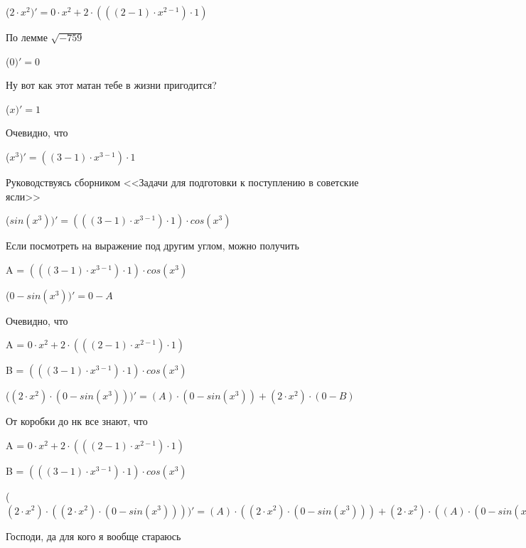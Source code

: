 \documentclass[12pt,a4paper,fleqn]{article}
\begin{document}
\begin{center}
 ($2 \cdot x^{2})'
  = 0 \cdot x^{2}+2 \cdot (((2-1) \cdot x^{2-1}) \cdot 1)$\end{center}
По лемме $\sqrt{-759}$
\begin{center}
 ($0)'
  = 0$\end{center}
Ну вот как этот матан тебе в жизни пригодится?

\begin{center}
 ($x)'
  = 1$\end{center}
Очевидно, что

\begin{center}
 ($x^{3})'
  = ((3-1) \cdot x^{3-1}) \cdot 1$\end{center}
Руководствуясь сборником <<Задачи для подготовки к поступлению в советские ясли>>\cite{link1}

\begin{center}
 ($sin(x^{3}))'
  = (((3-1) \cdot x^{3-1}) \cdot 1) \cdot cos(x^{3})$\end{center}
Если посмотреть на выражение под другим углом, можно получить

\begin{center}
A = $(((3-1) \cdot x^{3-1}) \cdot 1) \cdot cos(x^{3})$\end{center}
\begin{center}
 ($0-sin(x^{3}))'
  = 0-A$\end{center}
Очевидно, что

\begin{center}
A = $0 \cdot x^{2}+2 \cdot (((2-1) \cdot x^{2-1}) \cdot 1)$\end{center}
\begin{center}
B = $(((3-1) \cdot x^{3-1}) \cdot 1) \cdot cos(x^{3})$\end{center}
\begin{center}
 ($(2 \cdot x^{2}) \cdot (0-sin(x^{3})))'
  = (A) \cdot (0-sin(x^{3}))+(2 \cdot x^{2}) \cdot (0-B)$\end{center}
От коробки до нк все знают, что

\begin{center}
A = $0 \cdot x^{2}+2 \cdot (((2-1) \cdot x^{2-1}) \cdot 1)$\end{center}
\begin{center}
B = $(((3-1) \cdot x^{3-1}) \cdot 1) \cdot cos(x^{3})$\end{center}
\begin{center}
 ($(2 \cdot x^{2}) \cdot ((2 \cdot x^{2}) \cdot (0-sin(x^{3}))))'
  = (A) \cdot ((2 \cdot x^{2}) \cdot (0-sin(x^{3})))+(2 \cdot x^{2}) \cdot ((A) \cdot (0-sin(x^{3}))+(2 \cdot x^{2}) \cdot (0-B))$\end{center}
Господи, да для кого я вообще стараюсь
\end{document}
